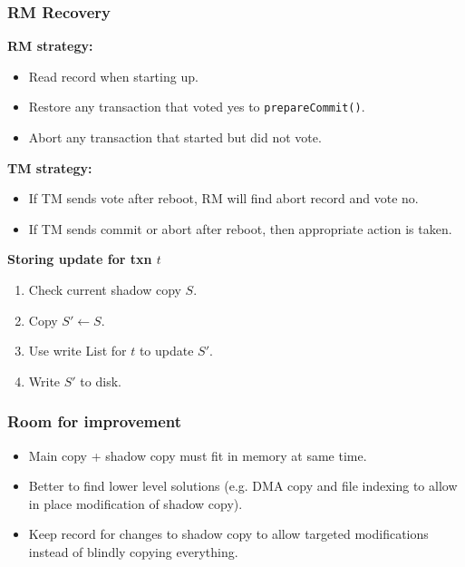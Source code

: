 \documentclass[10pt]{beamer}
\newcommand{\addfigure}[2]{

\begin{figure}[h]
	\centering
	\texttt{[image: figures/\#2]} 
\end{figure}

}
\begin{document}
\begin{frame}
\frametitle{RM Recovery}
\textbf{RM strategy:}
\begin{itemize}
  \item Read record when starting up.
  \item Restore any transaction that voted yes to \texttt{prepareCommit()}.
  \item Abort any transaction that started but did not vote.
\end{itemize}

\textbf{TM strategy:}
\begin{itemize}
  \item If TM sends vote after reboot, RM will find abort record and vote no.
  \item If TM sends commit or abort after reboot, then appropriate action is
  taken.
\end{itemize}

\textbf{Storing update for txn $t$}
\begin{enumerate}
  \item Check current shadow copy $S$.
  \item Copy $S' \leftarrow S$.
  \item Use write List for $t$ to update $S'$.
  \item Write $S'$ to disk.
\end{enumerate}

\end{frame}


\begin{frame}
\frametitle{Room for improvement}

\begin{itemize}
  \item Main copy + shadow copy must fit in memory at same
time. 
\item Better to find lower level solutions (e.g. DMA copy and file indexing to
allow in place modification of shadow copy).
\item Keep record for changes to shadow copy to allow targeted modifications
instead of blindly copying everything. 
\end{itemize}

\end{frame}

% 
% 
\end{document}
